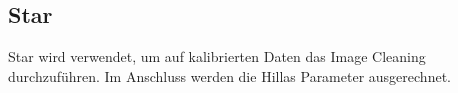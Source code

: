 \subsection{Star}%
\label{sub:star}

Star wird verwendet, um auf kalibrierten Daten
das Image Cleaning %
durchzuführen.
Im Anschluss werden die Hillas Parameter ausgerechnet.

